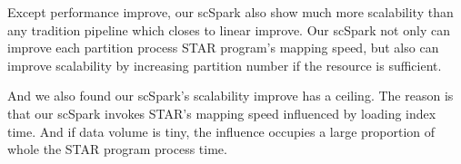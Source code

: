 \documentclass[conference]{IEEEtran}
\begin{document}
  Except performance improve, our scSpark also show much more scalability than any tradition pipeline which closes to linear improve.
  Our scSpark not only can improve each partition process STAR program's mapping speed, but also can improve scalability by increasing partition number if the resource is sufficient.
  
  And we also found our scSpark's scalability improve has a ceiling. 
  The reason is that our scSpark invokes STAR's mapping speed influenced by loading index time. 
  And if data volume is tiny, the influence occupies a large proportion of whole the STAR program process time. 







\end{document}
